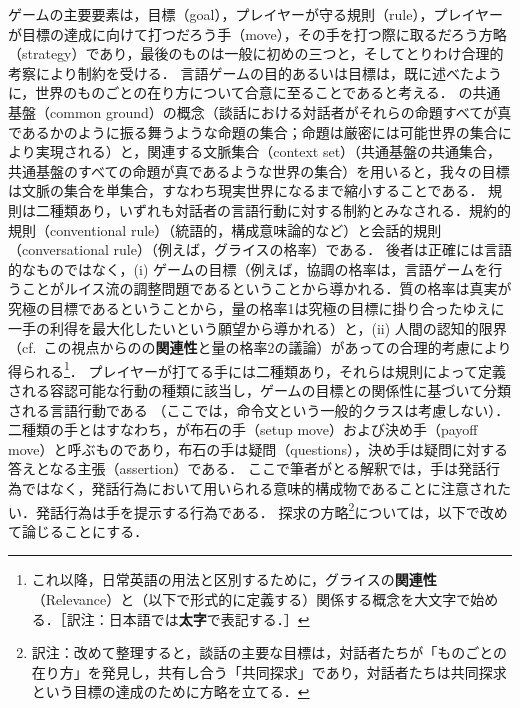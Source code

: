 \documentclass{goken}
\newcommand{\term}[2]{\textsf{#1}（#2）}
\newcommand{\ori}[1]{\noindent\textcolor[gray]{0.7}{\fontsize{8pt}{8pt}\selectfont{\textsf{(p.~#1)}}} }
\begin{document}
ゲームの主要要素は，\term{目標}{goal}，プレイヤーが守る\term{規則}{rule}，プレイヤーが目標の達成に向けて打つだろう\term{手}{move}，その手を打つ際に取るだろう\term{方略}{strategy}であり，最後のものは一般に初めの三つと，そしてとりわけ合理的考察により制約を受ける．
言語ゲームの目的あるいは目標は，既に述べたように，世界のものごとの在り方について合意に至ることであると考える．
\citet{Stalnaker1978}の\term{共通基盤}{common ground}の概念（談話における対話者がそれらの命題すべてが真であるかのように振る舞うような命題の集合；命題は厳密には可能世界の集合により実現される）と，関連する\term{文脈集合}{context set}（共通基盤の共通集合，共通基盤のすべての命題が真であるような世界の集合）を用いると，我々の目標は文脈の集合を単集合，すなわち現実世界になるまで縮小することである．
規則は二種類あり，いずれも対話者の言語行動に対する制約とみなされる．\term{規約的規則}{conventional rule}（統語的，構成意味論的など）と\term{会話的規則}{conversational rule}（例えば，グライスの格率）である．
後者は正確には言語的なものではなく，(i) ゲームの目標（例えば，協調の格率は，言語ゲームを行うことがルイス流の調整問題であるということから導かれる．質の格率は真実が究極の目標であるということから，量の格率1は究極の目標に掛り合ったゆえに一手の利得を最大化したいという願望から導かれる）と，(ii) 人間の認知的限界（cf.~この視点からの\citet{SperberWilson1986}の\textbf{関連性}と量の格率2の議論）があっての合理的考慮により得られる\footnote{これ以降，日常英語の用法と区別するために，グライスの\textbf{関連性}（Relevance）と（以下で形式的に定義する）関係する概念を大文字で始める．［訳注：日本語では\textbf{太字}で表記する．］}．
プレイヤーが打てる手には二種類あり，それらは規則によって定義される容認可能な行動の種類に該当し，ゲームの目標との関係性に基づいて分類される言語行動である\ori{5}（ここでは，命令文という一般的クラスは考慮しない）．二種類の手とはすなわち，\citet{Carlson1982}が\term{布石の手}{setup move}および\term{決め手}{payoff move}と呼ぶものであり，布石の手は\term{疑問}{questions}，決め手は疑問に対する答えとなる\term{主張}{assertion}である．
\renewcommand{\thefootnote}{\fnsymbol{footnote}}
\setcounter{footnote}{0}
ここで筆者がとる解釈では，手は発話行為ではなく，発話行為において用いられる意味的構成物であることに注意されたい．発話行為は手を提示する行為である．
探求の方略\footnote{訳注：改めて整理すると，談話の主要な目標は，対話者たちが「ものごとの在り方」を発見し，共有し合う「共同探求」であり，対話者たちは共同探求という目標の達成のために方略を立てる．}については，以下で改めて論じることにする．
\renewcommand{\thefootnote}{\arabic{footnote}~}
\setcounter{footnote}{5}
\end{document}
